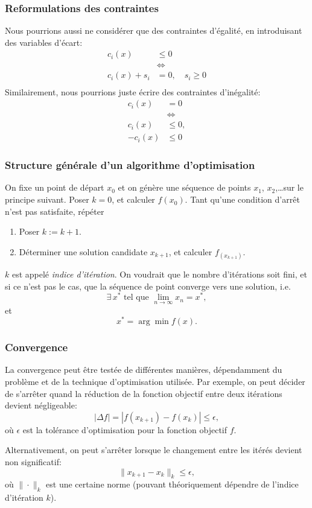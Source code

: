 \documentclass[usepdftitle=false]{beamer}
\def\red{\color{red}}
\begin{document}
\begin{frame}
\frametitle{Reformulations des contraintes}

Nous pourrions aussi ne considérer que des contraintes d'égalité, en introduisant des variables d'écart:
\begin{align*}
c_i(x) & \leq 0 \\
& \Leftrightarrow \\
c_i(x) + s_i & = 0, \quad s_i \geq 0 \\
\end{align*}
Similairement, nous pourrions juste écrire des contraintes d'inégalité:
\begin{align*}
c_i(x) & = 0 \\
& \Leftrightarrow \\
c_i(x) & \leq 0, \\
-c_i(x) & \leq 0
\end{align*}

\end{frame}

\begin{frame}
\frametitle{Structure générale d'un algorithme d'optimisation}

On fixe un point de départ $x_0$ et on génère une séquence de points $x_1$, $x_2$,\ldots sur le principe suivant.
Poser $k = 0$, et calculer $f(x_0)$. Tant qu'une condition d'arrêt n'est pas satisfaite, répéter
\begin{enumerate}
\item
Poser $k := k+1$.
\item
Déterminer une solution candidate $x_{k+1}$, et calculer $f_(x_{k+1})$.
\end{enumerate}

\mbox{}

$k$ est appelé {\sl indice d'itération}.
On voudrait que le nombre d'itérations soit fini, et si ce n'est pas le cas, que la séquence de point converge vers une solution, i.e.
\[
\exists\, x^* \mbox{ tel que } \lim_{n \rightarrow \infty} x_n = x^*,
\]
et
\[
x^* = \arg\min f(x). 
\]

\end{frame}

\begin{frame}
\frametitle{Convergence}

La convergence peut être testée de différentes manières, dépendamment du problème et de la technique d'optimisation utilisée.
Par exemple, on peut décider de s'arrêter quand la réduction de la fonction objectif entre deux itérations devient négligeable:
\[
|\Delta f| = |f(x_{k+1}) - f(x_k)| \leq \epsilon,
\]
où $\epsilon$ est la {\red tolérance d'optimisation} pour la fonction objectif $f$.

\mbox{}

Alternativement, on peut s'arrêter lorsque le changement entre les itérés devient non significatif:
\[
\| x_{k+1} - x_k \|_k \leq \epsilon,
\]
où $\| \cdot \|_k$ est une certaine norme (pouvant théoriquement dépendre de l'indice d'itération $k$).

\end{frame}
\end{document}
